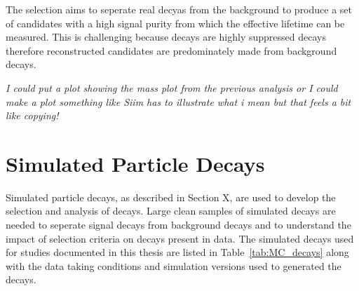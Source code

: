 The selection aims to seperate real \bsmumu decyas from the background to produce a set of \bsmumu candidates with a high signal purity from which the \bs effective lifetime can be measured. This is challenging because \bsmumu decays are highly suppressed decays therefore reconstructed candidates are predominately made from background decays.



{\it I could put a plot showing the mass plot from the previous analysis or I could make a plot something like Siim has to illustrate what i mean but that feels a bit like copying!}

\section{Simulated Particle Decays}
\label{sec:MCsamples}
Simulated particle decays, as described in Section X, are used to develop the selection and analysis of \bsmumu decays. Large clean samples of simulated decays are needed to seperate signal decays from background decays and to understand the impact of selection criteria on decays present in data. 
The simulated decays used for studies documented in this thesis are listed in Table~\ref{tab:MC_decays} along with the data taking conditions and simulation versions used to generated the decays.

